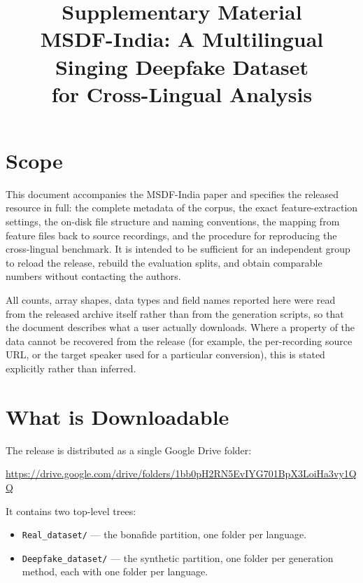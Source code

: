\documentclass[conference]{IEEEtran}
\title{Supplementary Material\\
\large MSDF-India: A Multilingual Singing Deepfake Dataset\\for Cross-Lingual Analysis}
\begin{document}
\maketitle

\section{Scope}
This document accompanies the MSDF-India paper and specifies the released resource in
full: the complete metadata of the corpus, the exact feature-extraction settings, the
on-disk file structure and naming conventions, the mapping from feature files back to
source recordings, and the procedure for reproducing the cross-lingual benchmark. It is
intended to be sufficient for an independent group to reload the release, rebuild the
evaluation splits, and obtain comparable numbers without contacting the authors.

All counts, array shapes, data types and field names reported here were read from the
released archive itself rather than from the generation scripts, so that the document
describes what a user actually downloads. Where a property of the data cannot be
recovered from the release (for example, the per-recording source URL, or the target
speaker used for a particular conversion), this is stated explicitly rather than
inferred.

\section{What is Downloadable}
The release is distributed as a single Google Drive folder:
\begin{center}
\url{https://drive.google.com/drive/folders/1bb0pH2RN5EvIYG701BpX3LoiHa3vy1QQ}
\end{center}

\noindent It contains two top-level trees:

\begin{itemize}
  \item \texttt{Real\_dataset/} --- the bonafide partition, one folder per language.
  \item \texttt{Deepfake\_dataset/} --- the synthetic partition, one folder per
        generation method, each with one folder per language.
\end{itemize}
\end{document}
